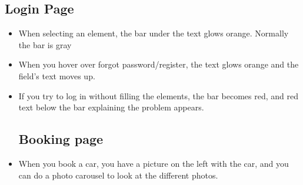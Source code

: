 \documentclass{article}
\begin{document}
\subsection{Login Page}
\begin{itemize}
    \item When selecting an element, the bar under the text glows orange. Normally the bar is gray
    \item When you hover over forgot password/register, the text glows orange and the field's text moves up.
    \item If you try to log in without filling the elements, the bar becomes red, and red text below the bar explaining the problem appears.

\subsection{Booking page}
\item When you book a car, you have a picture on the left with the car, and you can do a photo carousel to look at the different photos.
\end{itemize}
\end{document}
